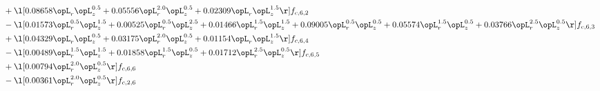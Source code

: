 \begin{alignat}{2}
& + \l[  0.08658 \opL_r \opL_z^{0.5} +  0.05556 \opL_r^{2.0} \opL_z^{0.5} +  0.02309 \opL_r \opL_z^{1.5}  \r] f_{c,6,2} \nonumber \\ 
& - \l[  0.01573 \opL_r^{0.5} \opL_z^{1.5} +  0.00525 \opL_r^{0.5} \opL_z^{2.5} +  0.01466 \opL_r^{1.5} \opL_z^{1.5} +  0.09005 \opL_r^{0.5} \opL_z^{0.5} +  0.05574 \opL_r^{1.5} \opL_z^{0.5} +  0.03766 \opL_r^{2.5} \opL_z^{0.5}  \r] f_{c,6,3} \nonumber \\ 
& + \l[  0.04329 \opL_r \opL_z^{0.5} +  0.03175 \opL_r^{2.0} \opL_z^{0.5} +  0.01154 \opL_r \opL_z^{1.5}  \r] f_{c,6,4} \nonumber \\ 
& - \l[  0.00489 \opL_r^{1.5} \opL_z^{1.5} +  0.01858 \opL_r^{1.5} \opL_z^{0.5} +  0.01712 \opL_r^{2.5} \opL_z^{0.5}  \r] f_{c,6,5} \nonumber \\ 
& + \l[  0.00794 \opL_r^{2.0} \opL_z^{0.5}  \r] f_{c,6,6} \nonumber \\ 
& - \l[  0.00361 \opL_r^{2.0} \opL_z^{0.5}  \r] f_{c,2,6} \nonumber \\ 
\end{alignat} 


